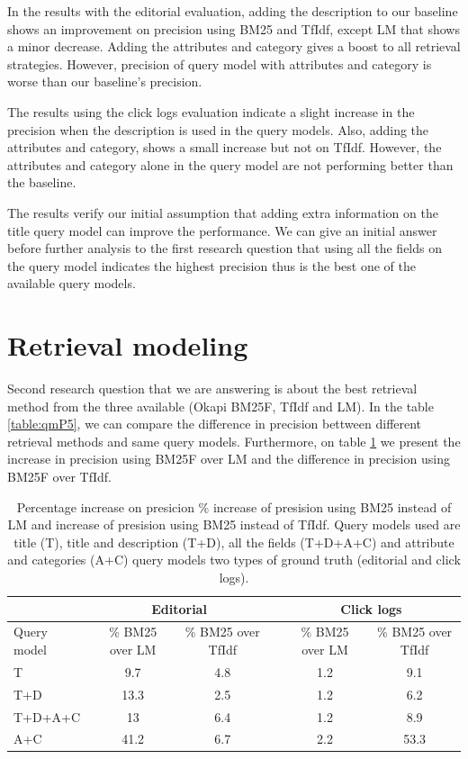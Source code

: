 In the results with the editorial evaluation, adding the description to our baseline shows an improvement on precision using BM25 and TfIdf, except LM that shows a minor decrease. Adding the attributes and category gives a boost to all retrieval strategies. However, precision of query model with attributes and category is worse than our baseline's precision.

The results using the click logs evaluation indicate a slight increase in the precision when the description is used in the query models. Also, adding the attributes and category, shows a small increase but not on TfIdf. However, the attributes and category alone in the query model are not performing better than the baseline.

The results verify our initial assumption that adding extra information on the title query model can improve the performance. We can give an initial answer before further analysis to the first research question that using all the fields on the query model indicates the highest precision thus is the best one of the available query models.


\section{Retrieval modeling}

Second research question that we are answering is about the best retrieval method from the three available (Okapi BM25F, TfIdf and LM). In the table \ref{table:qmP5}, we can compare the difference in precision bettween different retrieval methods and same query models. Furthermore, on table \ref{table:rmInc}
 we present the increase in precision using BM25F over LM and the difference in precision using BM25F over TfIdf.

\begin{table}[H]
\begin{center}
\scriptsize
\caption{ Percentage increase on presicion 
\% increase of presision using BM25 instead of LM and increase of presision using BM25 instead of TfIdf. Query models used are title (T), title and description (T+D), all the fields (T+D+A+C) and attribute and categories (A+C) query models two types of ground truth (editorial and click logs).}
\label{table:rmInc}

\begin{tabular}{lccccc}
\toprule
 & \multicolumn{2}{c}{Editorial} & &\multicolumn{2}{c}{Click logs} \\
\midrule
Query model & \% BM25 over LM & \% BM25 over TfIdf &   &  \% BM25 over LM & \% BM25 over TfIdf\\
\midrule
T & 9.7 & 4.8 &   & 1.2 & 9.1 \\
T+D & 13.3 & 2.5 &   & 1.2 & 6.2 \\
T+D+A+C & 13  & 6.4  &   & 1.2 & 8.9 \\
A+C & 41.2 & 6.7 &   &  2.2 & 53.3 \\

\bottomrule
\end{tabular}
\end{center}
\end{table}


